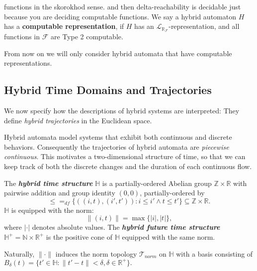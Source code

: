 \documentclass[envcountsect]{llncs}
\newcommand{\lrf}{\mathcal{L}_{\mathbb{R}_{\mathcal{F}}}}
\begin{document}
\begin{definition}
functions  in the skorokhod sense. and then delta-reachability is decidable just
because you are deciding computable functions. 
We say a hybrid automaton $H$ has a {\bf computable representation}, if $H$ has 
an $\lrf$-representation, and all functions in $\mathcal{F}$ are Type 2
computable. 
\end{definition}

From now on we will only consider hybrid automata that have computable 
representations. 

\subsection{Hybrid Time Domains and Trajectories}

We now specify how the descriptions of hybrid systems are interpreted: They
define  {\em hybrid trajectories} in the Euclidean space. 

Hybrid automata model systems that exhibit both continuous and discrete
behaviors.  Consequently the trajectories of hybrid automata are {\em piecewise
continuous}. This motivates a two-dimensional structure of time, so that we can
keep track of both the discrete changes and the duration of each continuous
flow.  

\begin{definition}
The {\bf\em hybrid time structure} $\mathbb{H}$ is a partially-ordered Abelian 
group $\mathbb{Z}\times\mathbb{R}$ with pairwise addition and group identity
$(0,0)$, partially-ordered by $$\leq =_{df} \{ ((i,t),(i',t')) : i\leq i' \wedge
t\leq t'\}\subseteq \mathbb{Z}\times\mathbb{R}.$$
 $\mathbb{H}$ is equipped with the norm: $$\|(i,t)\| = \max\{|i|,|t|\},$$
where $|\cdot|$ denotes absolute values. The {\bf\em hybrid future time
structure}  $\mathbb{H}^+=\mathbb{N}\times \mathbb{R}^+$ is the positive cone of
$\mathbb{H}$ equipped with the same norm.
\end{definition}

\begin{remark}
Naturally, $\|\cdot\|$ induces the norm topology $\mathcal{T}_{norm}$ on
$\mathbb{H}$  with a basis consisting of $B_{\delta}(t) = \{t'\in \mathbb{H}:
\|t'-t\|<\delta, \delta\in \mathbb{R}^+\}.$
\end{remark}
\end{document}
